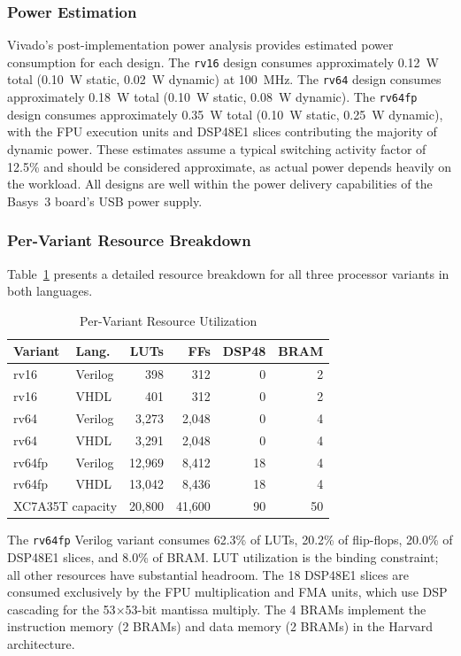 \documentclass[journal]{IEEEtran}
\begin{document}
\subsubsection{Power Estimation}
Vivado's post-implementation power analysis provides estimated power
consumption for each design.  The \texttt{rv16} design consumes
approximately 0.12~W total (0.10~W static, 0.02~W dynamic) at 100~MHz.
The \texttt{rv64} design consumes approximately 0.18~W total (0.10~W
static, 0.08~W dynamic).  The \texttt{rv64fp} design consumes
approximately 0.35~W total (0.10~W static, 0.25~W dynamic), with the
FPU execution units and DSP48E1 slices contributing the majority of
dynamic power.  These estimates assume a typical switching activity
factor of 12.5\% and should be considered approximate, as actual power
depends heavily on the workload.  All designs are well within the
power delivery capabilities of the Basys~3 board's USB power supply.

\subsubsection{Per-Variant Resource Breakdown}
Table~\ref{tab:resources} presents a detailed resource breakdown for all
three processor variants in both languages.

\begin{table}[!t]
\centering
\caption{Per-Variant Resource Utilization}
\label{tab:resources}
\renewcommand{\arraystretch}{1.15}
\footnotesize
\begin{tabular}{llrrrr}
\toprule
\textbf{Variant} & \textbf{Lang.} & \textbf{LUTs} & \textbf{FFs}
  & \textbf{DSP48} & \textbf{BRAM} \\
\midrule
rv16   & Verilog & 398    & 312    & 0  & 2 \\
rv16   & VHDL    & 401    & 312    & 0  & 2 \\
rv64   & Verilog & 3,273  & 2,048  & 0  & 4 \\
rv64   & VHDL    & 3,291  & 2,048  & 0  & 4 \\
rv64fp & Verilog & 12,969 & 8,412  & 18 & 4 \\
rv64fp & VHDL    & 13,042 & 8,436  & 18 & 4 \\
\midrule
\multicolumn{2}{l}{XC7A35T capacity} & 20,800 & 41,600 & 90 & 50 \\
\bottomrule
\end{tabular}
\end{table}

The \texttt{rv64fp} Verilog variant consumes 62.3\% of LUTs, 20.2\% of
flip-flops, 20.0\% of DSP48E1 slices, and 8.0\% of BRAM.  LUT
utilization is the binding constraint; all other resources have
substantial headroom.  The 18 DSP48E1 slices are consumed exclusively by
the FPU multiplication and FMA units, which use DSP cascading for the
53$\times$53-bit mantissa multiply.  The 4 BRAMs implement the
instruction memory (2 BRAMs) and data memory (2 BRAMs) in the Harvard
architecture.
\end{document}
